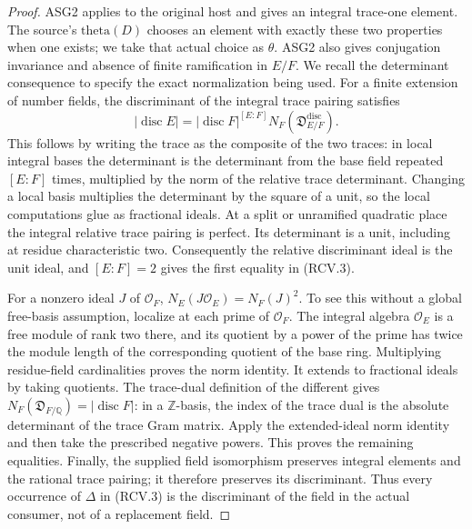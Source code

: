 \begin{proof}
ASG2 applies to the original host and gives an integral trace-one
element.  The source's \(\mathrm{theta}(D)\) chooses an element with
exactly these two properties when one exists; we take that actual
choice as \(\theta\).  ASG2 also gives conjugation invariance and
absence of finite ramification in
\(E/F\).  We recall the determinant consequence to specify the exact
normalization being used.  For a finite extension of number fields,
the discriminant of the integral trace pairing satisfies
\[
 |\operatorname{disc}E|
 =|\operatorname{disc}F|^{[E:F]}
       N_F(\mathfrak D_{E/F}^{\mathrm{disc}}).
\]
This follows by writing the trace as the composite of the two traces:
in local integral bases the determinant is the determinant from the
base field repeated \([E:F]\) times, multiplied by the norm of the
relative trace determinant.  Changing a local basis multiplies the
determinant by the square of a unit, so the local computations glue
as fractional ideals.  At a split or unramified quadratic place the
integral relative trace pairing is perfect.  Its determinant is a
unit, including at residue characteristic two.  Consequently the
relative discriminant ideal is the unit ideal, and \([E:F]=2\) gives
the first equality in (RCV.3).

For a nonzero ideal \(J\) of \(\mathcal O_F\),
\(N_E(J\mathcal O_E)=N_F(J)^2\).  To see this without a global
free-basis assumption, localize at each prime of \(\mathcal O_F\).
The integral algebra \(\mathcal O_E\) is a free module of rank two
there, and its quotient by a power of the prime has twice the
module length of the corresponding quotient of the base ring.
Multiplying residue-field cardinalities proves the norm identity.
It extends to fractional ideals by taking quotients.
The trace-dual definition of the different gives
\(N_F(\mathfrak D_{F/\mathbb Q})=|\operatorname{disc}F|\): in a
\(\mathbb Z\)-basis, the index of the trace dual is the absolute
determinant of the trace Gram matrix.  Apply the extended-ideal norm
identity and then take the prescribed negative powers.  This proves
the remaining equalities.  Finally, the supplied field isomorphism
preserves integral elements and the rational trace pairing; it
therefore preserves its discriminant.  Thus every occurrence of
\(\Delta\) in (RCV.3) is the discriminant of the field in the actual
consumer, not of a replacement field.
\end{proof}

